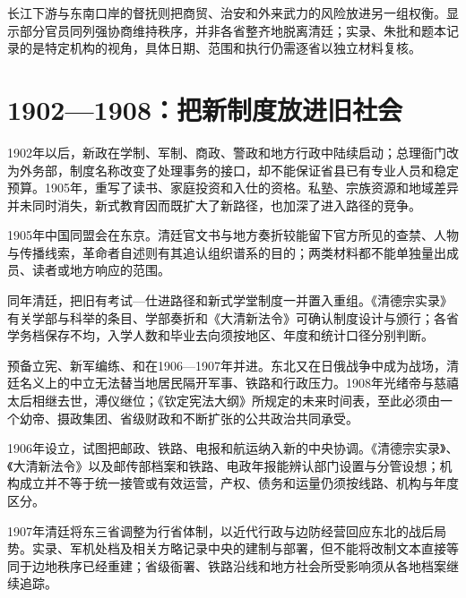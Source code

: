 长江下游与东南口岸的督抚则把商贸、治安和外来武力的风险放进另一组权衡。显示部分官员同列强协商维持秩序，并非各省整齐地脱离清廷；实录、朱批和题本记录的是特定机构的视角，具体日期、范围和执行仍需逐省以独立材料复核。



\section{1902—1908：把新制度放进旧社会}

1902年以后，新政在学制、军制、商政、警政和地方行政中陆续启动；总理衙门改为外务部，制度名称改变了处理事务的接口，却不能保证省县已有专业人员和稳定预算。1905年，重写了读书、家庭投资和入仕的资格。私塾、宗族资源和地域差异并未同时消失，新式教育因而既扩大了新路径，也加深了进入路径的竞争。

1905年中国同盟会在东京。清廷官文书与地方奏折较能留下官方所见的查禁、人物与传播线索，革命者自述则有其追认组织谱系的目的；两类材料都不能单独量出成员、读者或地方响应的范围。

同年清廷，把旧有考试—仕进路径和新式学堂制度一并置入重组。《清德宗实录》有关学部与科举的条目、学部奏折和《大清新法令》可确认制度设计与颁行；各省学务档保存不均，入学人数和毕业去向须按地区、年度和统计口径分别判断。

预备立宪、新军编练、和在1906—1907年并进。东北又在日俄战争中成为战场，清廷名义上的中立无法替当地居民隔开军事、铁路和行政压力。1908年光绪帝与慈禧太后相继去世，溥仪继位；《钦定宪法大纲》所规定的未来时间表，至此必须由一个幼帝、摄政集团、省级财政和不断扩张的公共政治共同承受。

1906年设立，试图把邮政、铁路、电报和航运纳入新的中央协调。《清德宗实录》、《大清新法令》以及邮传部档案和铁路、电政年报能辨认部门设置与分管设想；机构成立并不等于统一接管或有效运营，产权、债务和运量仍须按线路、机构与年度区分。

1907年清廷将东三省调整为行省体制，以近代行政与边防经营回应东北的战后局势。实录、军机处档及相关方略记录中央的建制与部署，但不能将改制文本直接等同于边地秩序已经重建；省级衙署、铁路沿线和地方社会所受影响须从各地档案继续追踪。

